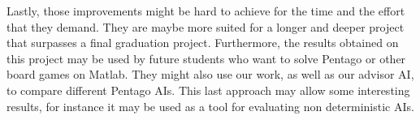 Lastly, those improvements might be hard to achieve for the time and the effort
that they demand. They are maybe more suited for a longer and deeper project
that surpasses a final graduation project. Furthermore, the results obtained on
this project may be used by future students who want to solve Pentago or other
board games on Matlab. They might also use our work, as well as our advisor AI,
to compare different Pentago AIs. This last approach may allow some interesting
results, for instance it may be used as a tool for evaluating non deterministic
AIs.

\newpage
